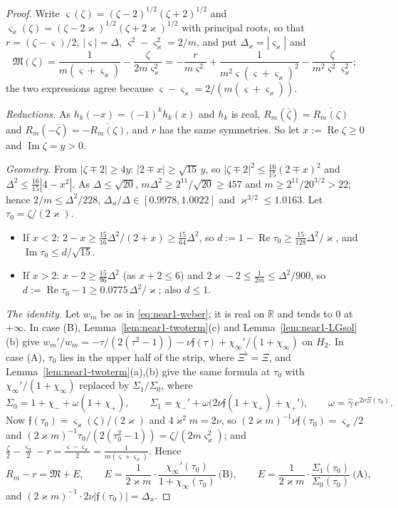\documentclass[11pt]{amsart}
\theoremstyle{definition}
\theoremstyle{remark}
\numberwithin{equation}{section}
\newcommand{\R}{\mathbb{R}}
\DeclareMathOperator{\re}{Re}
\DeclareMathOperator{\im}{Im}
\begin{document}
\begin{proof}
Write $\varsigma(\zeta)=(\zeta-2)^{1/2}(\zeta+2)^{1/2}$ and $\varsigma_\varkappa(\zeta)=(\zeta-2\varkappa)^{1/2}(\zeta+2\varkappa)^{1/2}$ with principal roots, so that $r=(\zeta-\varsigma)/2$, $|\varsigma|=\Delta$, $\varsigma^2-\varsigma_\varkappa^2=2/m$, and put $\Delta_\varkappa=|\varsigma_\varkappa|$ and
\[
\mathfrak M(\zeta)=\frac1{m(\varsigma+\varsigma_\varkappa)}-\frac\zeta{2m\varsigma_\varkappa^2}=-\frac r{m\varsigma^2}+\frac1{m^2\varsigma(\varsigma+\varsigma_\varkappa)^2}-\frac\zeta{m^2\varsigma^2\varsigma_\varkappa^2};
\]
the two expressions agree because $\varsigma-\varsigma_\varkappa=2/(m(\varsigma+\varsigma_\varkappa))$.

\emph{Reductions.} As $h_k(-x)=(-1)^kh_k(x)$ and $h_k$ is real, $R_m(\bar\zeta)=\overline{R_m(\zeta)}$ and $R_m(-\bar\zeta)=-\overline{R_m(\zeta)}$, and $r$ has the same symmetries. So let $x:=\re\zeta\ge0$ and $\im\zeta=y>0$.

\emph{Geometry.} From $|\zeta\mp2|\ge4y$: $|2\mp x|\ge\sqrt{15}\,y$, so $|\zeta\mp2|^2\le\frac{16}{15}(2\mp x)^2$ and $\Delta^2\le\frac{16}{15}|4-x^2|$. As $\Delta\le\sqrt{20}$, $m\Delta^2\ge2^{11}/\sqrt{20}\ge457$ and $m\ge2^{11}/20^{3/2}>22$; hence $2/m\le\Delta^2/228$, $\Delta_\varkappa/\Delta\in[0.9978,1.0022]$ and $\varkappa^{3/2}\le1.0163$. Let $\tau_0=\zeta/(2\varkappa)$.
\begin{itemize}
\item[(A)] If $x<2$: $2-x\ge\frac{15}{16}\Delta^2/(2+x)\ge\frac{15}{64}\Delta^2$, so $d:=1-\re\tau_0\ge\frac{15}{128}\Delta^2/\varkappa$, and $\im\tau_0\le d/\sqrt{15}$.
\item[(B)] If $x>2$: $x-2\ge\frac{15}{96}\Delta^2$ (as $x+2\le6$) and $2\varkappa-2\le\frac1{2m}\le\Delta^2/900$, so $d:=\re\tau_0-1\ge0.0775\,\Delta^2/\varkappa$; also $d\le1$.
\end{itemize}

\emph{The identity.} Let $w_m$ be as in \eqref{eq:near1-weber}; it is real on $\R$ and tends to $0$ at $+\infty$. In case (B), Lemma~\ref{lem:near1-twoterm}(c) and Lemma~\ref{lem:near1-LGsol}(b) give $w_m'/w_m=-\tau/(2(\tau^2-1))-\nu\mathfrak f(\tau)+\chi_\infty'/(1+\chi_\infty)$ on $H_2$. In case (A), $\tau_0$ lies in the upper half of the strip, where $\Xi^\flat=\Xi$, and Lemma~\ref{lem:near1-twoterm}(a),(b) give the same formula at $\tau_0$ with $\chi_\infty'/(1+\chi_\infty)$ replaced by $\Sigma_1/\Sigma_0$, where
\[
\Sigma_0=1+\chi_-+\omega(1+\chi_+),\qquad\Sigma_1=\chi_-'+\omega\bigl(2\nu\mathfrak f(1+\chi_+)+\chi_+'\bigr),\qquad\omega=\hat\gamma\,e^{2\nu\Xi(\tau_0)}.
\]
Now $\mathfrak f(\tau_0)=\varsigma_\varkappa(\zeta)/(2\varkappa)$ and $4\varkappa^2m=2\nu$, so $(2\varkappa m)^{-1}\nu\mathfrak f(\tau_0)=\varsigma_\varkappa/2$ and $(2\varkappa m)^{-1}\tau_0/(2(\tau_0^2-1))=\zeta/(2m\varsigma_\varkappa^2)$; and $\frac\zeta2-\frac{\varsigma_\varkappa}2-r=\frac{\varsigma-\varsigma_\varkappa}2=\frac1{m(\varsigma+\varsigma_\varkappa)}$. Hence
\[
R_m-r=\mathfrak M+E,\qquad E=\frac1{2\varkappa m}\cdot\frac{\chi_\infty'(\tau_0)}{1+\chi_\infty(\tau_0)}\ \text{(B)},\qquad E=\frac1{2\varkappa m}\cdot\frac{\Sigma_1(\tau_0)}{\Sigma_0(\tau_0)}\ \text{(A)},
\]
and $(2\varkappa m)^{-1}\cdot2\nu|\mathfrak f(\tau_0)|=\Delta_\varkappa$.


\end{proof}
\end{document}
